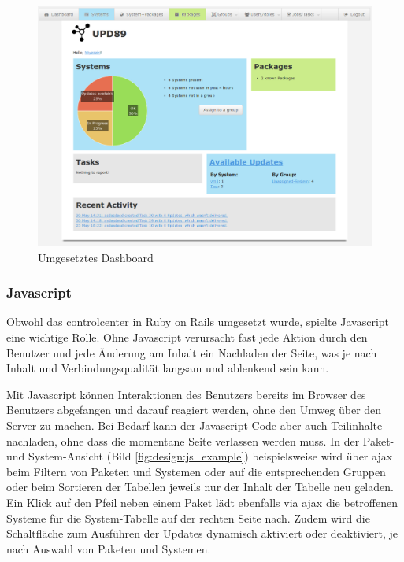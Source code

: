\begin{figure}[H]
	\centering
	\includegraphics[width=\linewidth]{files/upd89-screenshot_dashboard}
	\caption{Umgesetztes Dashboard}
	\label{fig:design:dashboard}
\end{figure}

\subsubsection*{Javascript}

Obwohl das \gls{controlcenter} in Ruby on Rails umgesetzt wurde, spielte Javascript eine wichtige Rolle. Ohne Javascript verursacht fast jede Aktion durch den Benutzer und jede Änderung am Inhalt ein Nachladen der Seite, was je nach Inhalt und Verbindungsqualität langsam und ablenkend sein kann. 

Mit Javascript können Interaktionen des Benutzers bereits im Browser des Benutzers abgefangen und darauf reagiert werden, ohne den Umweg über den Server zu machen. Bei Bedarf kann der Javascript-Code aber auch Teilinhalte nachladen, ohne dass die momentane Seite verlassen werden muss. In der Paket- und System-Ansicht (Bild \ref{fig:design:js_example}) beispielsweise wird über \gls{ajax} beim Filtern von Paketen und Systemen oder auf die entsprechenden Gruppen oder beim Sortieren  der Tabellen jeweils nur der Inhalt der Tabelle neu geladen. Ein Klick auf den Pfeil neben einem Paket lädt ebenfalls via \gls{ajax} die betroffenen Systeme für die System-Tabelle auf der rechten Seite nach. Zudem wird die Schaltfläche zum Ausführen der Updates dynamisch aktiviert oder deaktiviert, je nach Auswahl von Paketen und Systemen.

